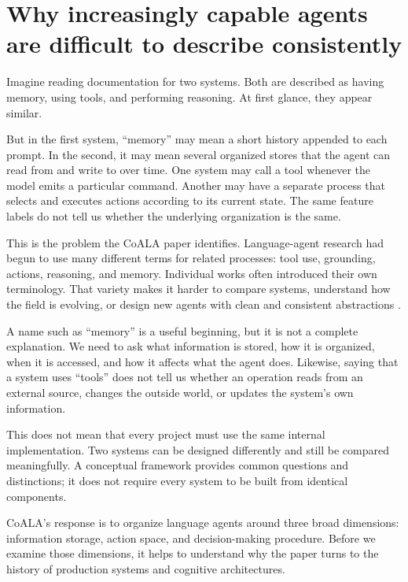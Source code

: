 \section{Why increasingly capable agents are difficult to describe consistently}\label{why-increasingly-capable-agents-are-difficult-to-describe-consistently}

Imagine reading documentation for two systems. Both are described as having memory, using tools, and performing reasoning. At first glance, they appear similar.

But in the first system, ``memory'' may mean a short history appended to each prompt. In the second, it may mean several organized stores that the agent can read from and write to over time. One system may call a tool whenever the model emits a particular command. Another may have a separate process that selects and executes actions according to its current state. The same feature labels do not tell us whether the underlying organization is the same.

This is the problem the CoALA paper identifies. Language-agent research had begun to use many different terms for related processes: tool use, grounding, actions, reasoning, and memory. Individual works often introduced their own terminology. That variety makes it harder to compare systems, understand how the field is evolving, or design new agents with clean and consistent abstractions .

A name such as ``memory'' is a useful beginning, but it is not a complete explanation. We need to ask what information is stored, how it is organized, when it is accessed, and how it affects what the agent does. Likewise, saying that a system uses ``tools'' does not tell us whether an operation reads from an external source, changes the outside world, or updates the system's own information.

This does not mean that every project must use the same internal implementation. Two systems can be designed differently and still be compared meaningfully. A conceptual framework provides common questions and distinctions; it does not require every system to be built from identical components.

CoALA's response is to organize language agents around three broad dimensions: information storage, action space, and decision-making procedure. Before we examine those dimensions, it helps to understand why the paper turns to the history of production systems and cognitive architectures.

